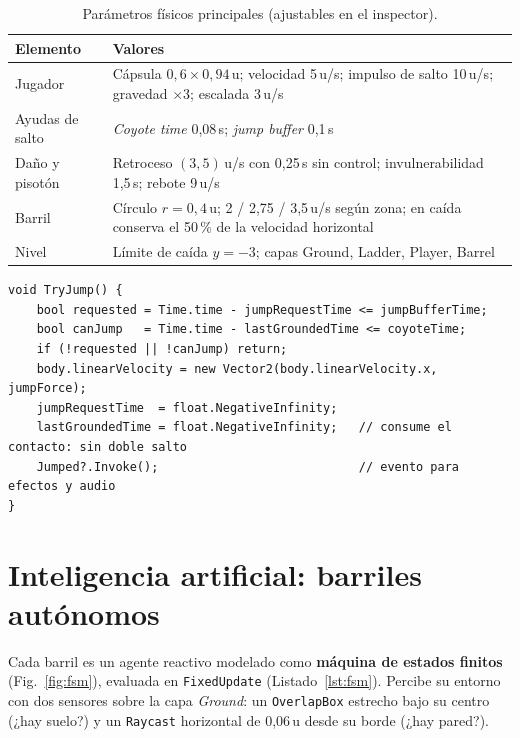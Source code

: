 \documentclass[runningheads]{llncs}
\begin{document}
\begin{table}[H]
\caption{Parámetros físicos principales (ajustables en el inspector).}\label{tab:fis}
\centering\scriptsize
\begin{tabularx}{\linewidth}{@{}lX@{}}
\toprule
\textbf{Elemento} & \textbf{Valores} \\ \midrule
Jugador & Cápsula $0{,}6\times0{,}94$\,u; velocidad 5\,u/s; impulso de salto 10\,u/s; gravedad $\times3$; escalada 3\,u/s \\
Ayudas de salto & \emph{Coyote time} 0,08\,s; \emph{jump buffer} 0,1\,s \\
Daño y pisotón & Retroceso $(3,5)$\,u/s con 0,25\,s sin control; invulnerabilidad 1,5\,s; rebote 9\,u/s \\
Barril & Círculo $r=0{,}4$\,u; 2 / 2,75 / 3,5\,u/s según zona; en caída conserva el 50\,\% de la velocidad horizontal \\
Nivel & Límite de caída $y=-3$; capas Ground, Ladder, Player, Barrel \\
\bottomrule
\end{tabularx}
\end{table}

\par\noindent\begin{minipage}{\linewidth}
\begin{lstlisting}[caption={Salto con \emph{coyote time} y \emph{jump buffer} (\texttt{PlayerController.cs}).},label=lst:jump]
void TryJump() {
    bool requested = Time.time - jumpRequestTime <= jumpBufferTime;
    bool canJump   = Time.time - lastGroundedTime <= coyoteTime;
    if (!requested || !canJump) return;
    body.linearVelocity = new Vector2(body.linearVelocity.x, jumpForce);
    jumpRequestTime  = float.NegativeInfinity;
    lastGroundedTime = float.NegativeInfinity;   // consume el contacto: sin doble salto
    Jumped?.Invoke();                            // evento para efectos y audio
}
\end{lstlisting}
\end{minipage}\par

\section{Inteligencia artificial: barriles autónomos}
Cada barril es un agente reactivo modelado como \textbf{máquina de estados finitos}~\cite{millington}
(Fig.~\ref{fig:fsm}), evaluada en \texttt{FixedUpdate} (Listado~\ref{lst:fsm}). Percibe su entorno con
dos sensores sobre la capa \emph{Ground}: un \texttt{OverlapBox} estrecho bajo su centro (¿hay suelo?)
y un \texttt{Raycast} horizontal de 0,06\,u desde su borde (¿hay pared?).
\end{document}
